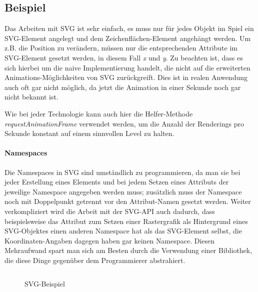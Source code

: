 \documentclass[a4paper, 12pt]{article}
\begin{document}
\subsection{Beispiel}
Das Arbeiten mit SVG ist sehr einfach, es muss nur für jedes Objekt im Spiel ein SVG-Element angelegt und dem Zeichenflächen-Element angehängt werden. Um z.B. die Position zu verändern, müssen nur die entsprechenden Attribute im SVG-Element gesetzt werden, in diesem Fall \emph{x} und \emph{y}. Zu beachten ist, dass es sich hierbei um die naive Implementierung handelt, die nicht auf die erweiterten Animations-Möglichkeiten von SVG zurückgreift. Dies ist in realen Anwendung auch oft gar nicht möglich, da jetzt die Animation in einer Sekunde noch gar nicht bekannt ist.

Wie bei jeder Technologie kann auch hier die Helfer-Methode \emph{requestAnimationFrame} verwendet werden, um die Anzahl der Renderings pro Sekunde konstant auf einem sinnvollen Level zu halten.

\paragraph{Namespaces} Die Namespaces in SVG sind umständlich zu programmieren, da man sie bei jeder Erstellung eines Elements und bei jedem Setzen eines Attributs der jeweilige Namespace angegeben werden muss; zusätzlich muss der Namespace noch mit Doppelpunkt getrennt vor den Attribut-Namen gesetzt werden. Weiter verkompliziert wird die Arbeit mit der SVG-API auch dadurch, dass beispielsweise das Attribut zum Setzen einer Rastergrafik als Hintergrund eines SVG-Objektes einen anderen Namespace hat als das SVG-Element selbst, die Koordinaten-Angaben dagegen haben gar keinen Namespace. Diesen Mehraufwand spart man sich am Besten durch die Verwendung einer Bibliothek, die diese Dinge gegenüber dem Programmierer abstrahiert.
\begin{figure}[H]
	\inputminted{javascript}{assets/vanillasvg_example.js}
	\caption{SVG-Beispiel}
	\label{svg_example}
\end{figure}
\newpage
\end{document}
